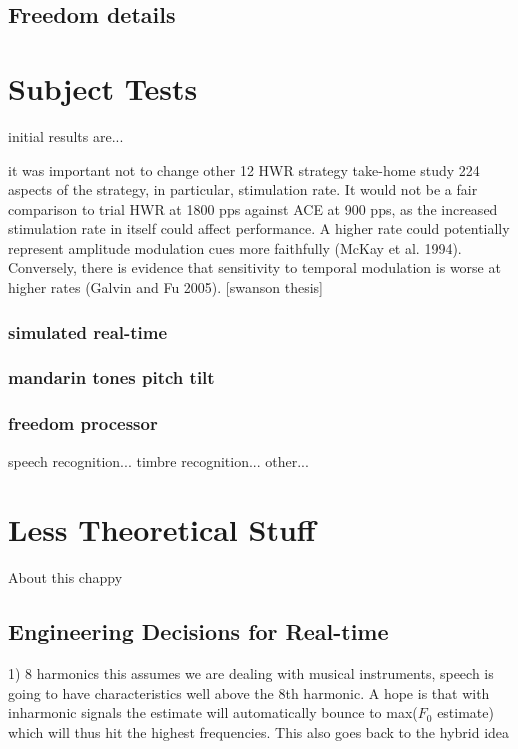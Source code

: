 \documentclass [11pt, proquest] {uwthesis}[2015/03/03]
\begin{document}
\section{Freedom details}


\chapter{Subject Tests}
initial results are...



 it was important not to change other
12 HWR strategy take-home study 224
aspects of the strategy, in particular, stimulation rate. It would not be a fair comparison to trial HWR at 1800 pps against ACE at 900 pps, as the increased stimulation rate in itself could affect performance. A higher rate could potentially represent amplitude modulation cues more faithfully (McKay et al. 1994). Conversely, there is evidence that sensitivity to temporal modulation is worse at higher rates (Galvin and Fu 2005).
[swanson thesis]

	\subsection{simulated real-time}
	
	\subsection{mandarin tones pitch tilt}
	
	\subsection{freedom processor}
		speech recognition...
		timbre recognition...
		other...


 
\chapter{Less Theoretical Stuff}

About this chappy

\section{Engineering Decisions for Real-time}

1) 8 harmonics
this assumes we are dealing with musical instruments, speech is going to have characteristics well above the 8th harmonic.  A hope is that with inharmonic signals the estimate will automatically bounce to max($F_0$ estimate) which will thus hit the highest frequencies.  This also goes back to the hybrid idea
\end{document}

